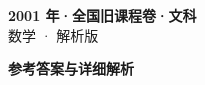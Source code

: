 \documentclass[zihao=-4, a4paper]{ctexart}
\begin{document}
\begin{center}
  {\Large\bfseries 2001 年·全国旧课程卷·文科}\\[4pt]
  {\large 数学 · 解析版}
\end{center}
\medskip
{}

\clearpage
{}
\begin{center}{\Large\bfseries 参考答案与详细解析}\end{center}
\medskip

\end{document}
